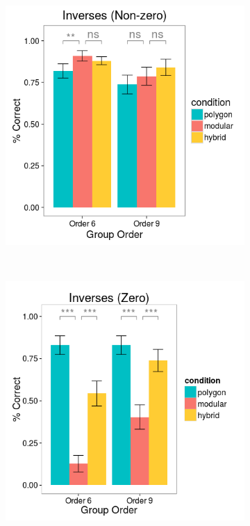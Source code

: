 \documentclass[man,10pt]{apa6}
\begin{document}
\begin{figure}[H]
\centering
\begin{subfigure}[c]{0.3\textwidth}
\centering
\includegraphics[width=\textwidth]{figures/2/in_NZ_r.png}
\end{subfigure}
~
\begin{subfigure}[c]{0.3\textwidth}
\centering
\includegraphics[width=\textwidth]{figures/2/in_Z_r.png}

\end{subfigure}
\end{figure}
\end{document}
